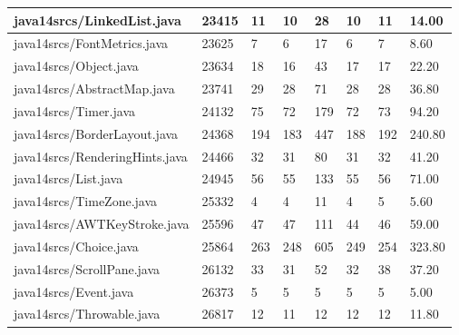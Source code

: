 \begin{tabular}{|l|l|l|l|l|l|l|l|}
\hline
java14srcs/LinkedList.java                         & 23415       & 11        & 10        & 28        & 10        & 11        & 14.00     \\
\hline
java14srcs/FontMetrics.java                        & 23625       & 7         & 6         & 17        & 6         & 7         & 8.60      \\
\hline
java14srcs/Object.java                             & 23634       & 18        & 16        & 43        & 17        & 17        & 22.20     \\
\hline
java14srcs/AbstractMap.java                        & 23741       & 29        & 28        & 71        & 28        & 28        & 36.80     \\
\hline
java14srcs/Timer.java                              & 24132       & 75        & 72        & 179       & 72        & 73        & 94.20     \\
\hline
java14srcs/BorderLayout.java                       & 24368       & 194       & 183       & 447       & 188       & 192       & 240.80    \\
\hline
java14srcs/RenderingHints.java                     & 24466       & 32        & 31        & 80        & 31        & 32        & 41.20     \\
\hline
java14srcs/List.java                               & 24945       & 56        & 55        & 133       & 55        & 56        & 71.00     \\
\hline
java14srcs/TimeZone.java                           & 25332       & 4         & 4         & 11        & 4         & 5         & 5.60      \\
\hline
java14srcs/AWTKeyStroke.java                       & 25596       & 47        & 47        & 111       & 44        & 46        & 59.00     \\
\hline
java14srcs/Choice.java                             & 25864       & 263       & 248       & 605       & 249       & 254       & 323.80    \\
\hline
java14srcs/ScrollPane.java                         & 26132       & 33        & 31        & 52        & 32        & 38        & 37.20     \\
\hline
java14srcs/Event.java                              & 26373       & 5         & 5         & 5         & 5         & 5         & 5.00      \\
\hline
java14srcs/Throwable.java                          & 26817       & 12        & 11        & 12        & 12        & 12        & 11.80     \\

\end{tabular}
